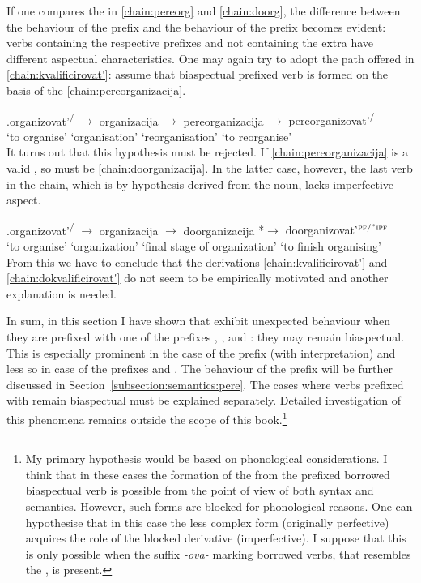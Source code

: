 If one compares the  in \ref{chain:pereorg} and \ref{chain:doorg}, the difference between the behaviour of the prefix  and the behaviour of the prefix  becomes evident: verbs containing the respective prefixes and not containing the extra  have different aspectual characteristics. One may again try to adopt the path offered in \ref{chain:kvalificirovat'}: assume that biaspectual prefixed verb is formed on the basis of the  \ref{chain:pereorganizacija}.
 
\exg.\label{chain:pereorganizacija}organizovat'\textsuperscript{\PF\slash\IPF} {$\rightarrow$} organizacija {$\rightarrow$} pereorganizacija {$\rightarrow$} {pereorganizovat'\textsuperscript{\PF\slash\IPF}}\\
{`to organise'} {} `organisation' {} `reorganisation' {} {`to reorganise'}\\

It turns out that this hypothesis must be rejected. If \ref{chain:pereorganizacija} is a valid , so must be \ref{chain:doorganizacija}. In the latter case, however, the last verb in the chain, which is by hypothesis derived from the noun, lacks imperfective aspect. 

\exg.\label{chain:doorganizacija}organizovat'\textsuperscript{\PF\slash\IPF} {$\rightarrow$} organizacija {$\rightarrow$} doorganizacija {*$\rightarrow$} {doorganizovat'$^{{\textsc{pf}}/^*{\textsc{ipf}}}$}\\
{`to organise'} {} `organization' {} {`final stage of organization'} {} {`to finish organising'}\\

From this we have to conclude that the derivations \ref{chain:kvalificirovat'} and \ref{chain:dokvalificirovat'} do not seem to be empirically motivated and another explanation is needed. 

In sum, in this section I have shown that   exhibit unexpected behaviour when they are prefixed with one of the prefixes , , and : they may remain biaspectual. This is especially prominent in the case of the prefix  (with  interpretation) and less so in case of the prefixes  and . The  behaviour of the prefix  will be further discussed in Section~\ref{subsection:semantics:pere}. The cases where verbs prefixed with  remain biaspectual must be explained separately. Detailed investigation of this phenomena remains outside the scope of this book.\footnote{My primary hypothesis would be based on phonological considerations. I think that in these cases the formation of the  from the prefixed borrowed biaspectual verb is possible from the point of view of both syntax and semantics. However, such forms are blocked for phonological reasons. One can hypothesise that in this case the less complex form (originally perfective) acquires the role of the blocked derivative (imperfective). I suppose that this is only possible when the suffix \textit{-ova-} marking borrowed verbs, that resembles the , is present.}
	
